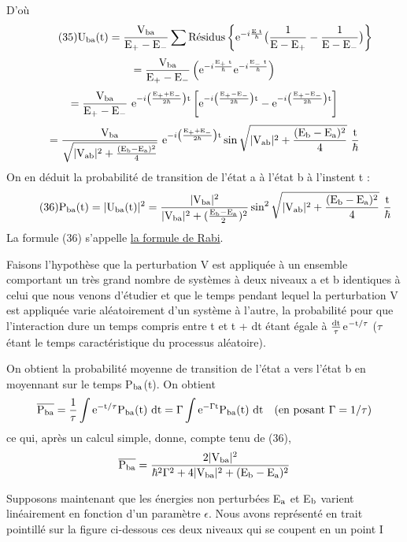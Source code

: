 D'où
\[
\tag{35}\text{U}_{\text{ba}}\text{(t)}=\frac{\text{V}_{\text{ba}}}{\text{E}_+-\text{E}_-}\sum\text{Résidus}\left\{
\text{e}^{-i\frac{\text{E t}}{\hbar}}\big(\frac{1}{\text{E}-\text{E}_+}-\frac{1}{\text{E}-\text{E}_-}\big)\right\}
\]
\[
=\frac{\text{V}_{\text{ba}}}{\text{E}_+-\text{E}_-}
\left(\text{e}^{-i\frac{\text{E}_+\text{ t}}{\hbar}}\text{e}^{-i\frac{\text{E}_-\text{ t}}{\hbar}}\right)
\]
\[
=\frac{\text{V}_{\text{ba}}}{\text{E}_+-\text{E}_-}\text{ e}^{-i\left(\frac{\text{E}_++\text{E}_-}{2\hbar}\right)\text{t}}\left[
\text{e}^{-i\left(\frac{\text{E}_+-\text{E}_-}{2\hbar}\right)\text{t}}-
\text{e}^{-i\left(\frac{\text{E}_+-\text{E}_-}{2\hbar}\right)\text{t}}\right]
\]
\[
=\frac{\mt{V}_\mt{ba}}{\sqrt{|\mt{V}_\mt{ab}|^2+\frac{(\mt{E}_\mt{b}-\mt{E}_\mt{a})^2}{4}}}
\mt{ e}^{-i\left(\frac{\mt{E}_++\mt{E}_-}{2\hbar}\right)\mt{t}}
\sin\sqrt{|\mt{V}_\mt{ab}|^2+\frac{(\mt{E}_\mt{b}-\mt{E}_\mt{a})^2}{4}}\ \frac{\mt{t}}{\hbar}
\]
On en déduit la probabilité de transition de l'état a à l'état b à l'instent t :
\[
\tag{36}\mt{P}_\mt{ba}\mt{(t)}=|\mt{U}_\mt{ba}\mt{(t)}|^2=
\frac{|\mt{V}_\mt{ba}|^2}{|\mt{V}_\mt{ba}|^2+(\frac{\mt{E}_\mt{b}-\mt{E}_\mt{a}}{2})^2}
\sin^2\sqrt{|\mt{V}_\mt{ab}|^2+\frac{(\mt{E}_\mt{b}-\mt{E}_\mt{a})^2}{4}}\ \frac{\mt{t}}{\hbar}
\]
La formule (36) s'appelle \ul{la formule de Rabi}.

Faisons l'hypothèse que la perturbation V est appliquée à un ensemble comportant un très
grand nombre de systèmes à deux niveaux a et b identiques
à celui que nous venons d'étudier et que le temps pendant lequel la perturbation
V est appliquée varie aléatoirement d'un système à l'autre, la probabilité pour
que l'interaction dure un temps compris entre t et t + dt étant égale à $\frac{\text{dt}}{\tau}$e$^{-\text{t}/\tau}$
($\tau$ étant le temps caractéristique du processus aléatoire).

On obtient la probabilité moyenne de transition de l'état a vers l'état
b en moyennant sur le temps P$_{\text{ba}}$(t). On obtient
\[
\overline{\text{P}_{\text{ba}}}=\frac{1}{\tau}\int\text{e}^{-\text{t}/\tau}\text{P}_{\text{ba}}\text{(t) dt}
=\Gamma\int\text{e}^{-\Gamma\text{t}}\text{P}_{\text{ba}}\text{(t) dt}\quad\text{(en posant }\Gamma=1/\tau)
\]
ce qui, après un calcul simple, donne, compte tenu de (36),
\[
\overline{\text{P}_{\text{ba}}}=\frac{2|\text{V}_{\text{ba}}|^2}
{\hbar^2\Gamma^2+4|\text{V}_{\text{ba}}|^2+(\text{E}_{\text{b}}-\text{E}_{\text{a}})^2}
\]

Supposons maintenant que les énergies non perturbées E$_{\text{a}}$ et E$_{\text{b}}$ varient linéairement
en fonction d'un paramètre $\epsilon$. Nous avons représenté en
trait pointillé sur la figure ci-dessous ces deux niveaux qui se coupent en
un point I
\begin{center} 
\end{center}

